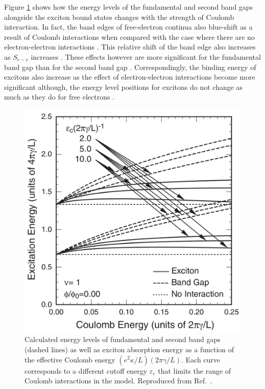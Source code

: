 Figure \ref{fig:coulomb_shift} shows how the energy levels of the fundamental and second band gaps alongside the exciton bound states changes with the strength of Coulomb interaction. In fact, the band edges of free-electron continua also blue-shift as a result of Coulomb interactions when compared with the case where there are no electron-electron interactions \cite{ando1997excitons}. This relative shift of the band edge also increases as $S_{e-e}$ increases \cite{ando2005theory}. These effects however are more significant for the fundamental band gap than for the second band gap \cite{ando2005theory}. Correspondingly, the binding energy of excitons also increase as the effect of electron-electron interactions become more significant although, the energy level positions for excitons do not change as much as they do for free electrons \cite{ando2005theory}.

\begin{figure}[ht]
	\centering
	\includegraphics[scale=0.25]{images/chapter_optical_props/coulomb_shift_ando}
	\caption{Calculated energy levels of fundamental and second band gaps (dashed lines) as well as exciton absorption energy as a function of the effective Coulomb energy $(e^2 \kappa / L) (2 \pi \gamma / L)$. Each curve corresponds to a different cutoff energy $\varepsilon_\text{c}$ that limits the range of Coulomb interactions in the model. Reproduced from Ref.\ \cite{ando2005theory}.}
	\label{fig:coulomb_shift}
\end{figure}

